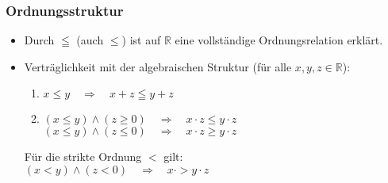 \subsubsection{Ordnungsstruktur}
\begin{itemize}
\item Durch $\leqq$ (auch $\leq$) ist auf $\mathbb{R}$ eine vollständige Ordnungsrelation erklärt.
\item Verträglichkeit mit der algebraischen Struktur (für alle $x,y,z\in \mathbb{R}$):
\begin{enumerate}[label=(\arabic*)]
\item $x\leq y \quad \Rightarrow \quad x+z \leqq y+z$
\item $(x\leq y) \wedge (z \geq 0 )\quad \Rightarrow \quad x \cdot z \leq y \cdot z$\\
$(x\leq y) \wedge (z \leq 0 )\quad \Rightarrow \quad x \cdot z \geq y \cdot z$
\end{enumerate}
Für die strikte Ordnung $<$ gilt:\\
$\boxed{(x<y)\wedge (z<0) \quad \Rightarrow \quad x \cdot > y \cdot z}$
\end{itemize}
